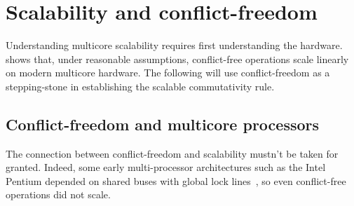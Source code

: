 \section{Scalability and conflict-freedom}
\label{sec:scalability}








Understanding multicore scalability requires first understanding the
hardware.
%
 shows that, under
reasonable assumptions, conflict-free operations scale linearly on
modern multicore hardware.
%
The following  will use conflict-freedom as a
stepping-stone in establishing the scalable commutativity rule.



\subsection{Conflict-freedom and multicore processors}

The connection between conflict-freedom and scalability mustn't be taken
for granted.  Indeed, some early multi-processor architectures such as
the Intel Pentium depended on shared buses with global lock
lines~\cite[\S8.1.4]{intel-sdm-3}, so even conflict-free operations
did not scale.

